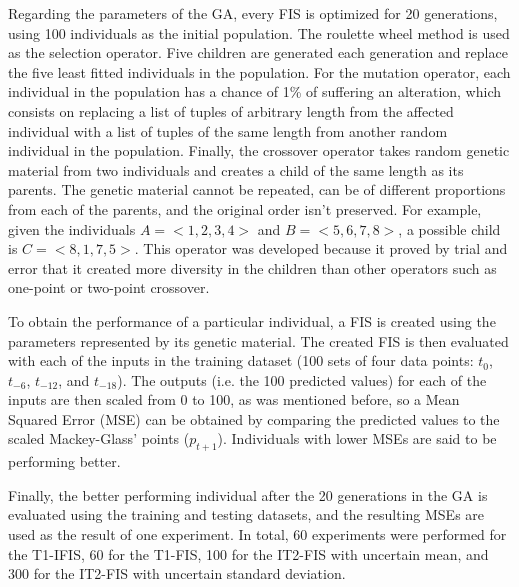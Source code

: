 \documentclass[conference]{IEEEtran}
\begin{document}
Regarding the parameters of the GA, every FIS is optimized for 20
generations, using 100 individuals as the initial population. The
roulette wheel method is used as the selection operator. Five
children are generated each generation and replace the five least
fitted individuals in the population. For the mutation operator, each
individual in the population has a chance of 1\% of suffering an
alteration, which consists on replacing a list of tuples of arbitrary
length from the affected individual with a list of tuples of the same
length from another random individual in the population. Finally, the
crossover operator takes random genetic material from two individuals
and creates a child of the same length as its parents. The genetic
material cannot be repeated, can be of different proportions from each
of the parents, and the original order isn't preserved. For example,
given the individuals $A = <1, 2, 3, 4>$ and $B = <5, 6, 7, 8>$, a
possible child is $C = <8, 1, 7, 5>$. This operator was developed
because it proved by trial and error that it created more diversity in
the children than other operators such as one-point or two-point
crossover.

To obtain the performance of a particular individual, a FIS is created
using the parameters represented by its genetic material. The created
FIS is then evaluated with each of the inputs in the training dataset
(100 sets of four data points: $t_{0}$, $t_{-6}$, $t_{-12}$, and
$t_{-18}$). The outputs (i.e. the 100 predicted values) for each of
the inputs are then scaled from 0 to 100, as was mentioned before, so
a Mean Squared Error (MSE) can be obtained by comparing the predicted values
to the scaled Mackey-Glass' points ($p_{t+1}$). Individuals with lower
MSEs are said to be performing better.

Finally, the better performing individual after the 20 generations in
the GA is evaluated using the training and testing datasets, and the
resulting MSEs are used as the result of one experiment. In total, 60
experiments were performed for the T1-IFIS, 60 for the T1-FIS, 100 for
the IT2-FIS with uncertain mean, and 300 for the IT2-FIS with
uncertain standard deviation.



\end{document}

